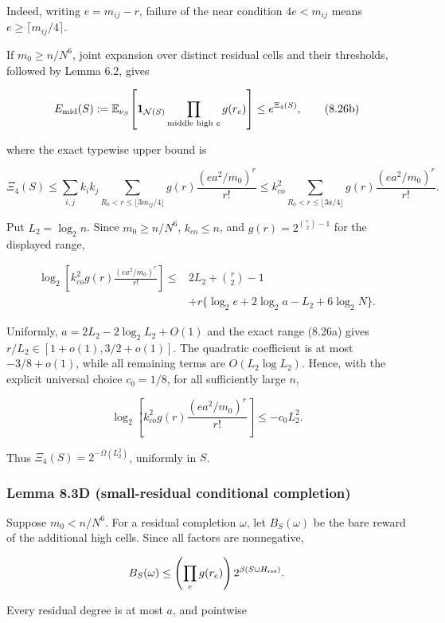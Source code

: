 \documentclass[11pt]{article}
\begin{document}
Indeed, writing \(e=m_{ij}-r\), failure of the near condition \(4e<m_{ij}\) means \(e\ge\lceil m_{ij}/4\rceil\).

If \(m_0\ge n/N^6\), joint expansion over distinct residual cells and their thresholds, followed by Lemma 6.2, gives

\[
 E_{\rm mid}(S)
 :=\mathbb E_{\nu_S}\!\left[
   \mathbf1_{\mathcal N(S)}\prod_{\text{middle high }e}g(r_e)
 \right]
 \le e^{\Xi_4(S)},
 \tag{8.26b}
\]

where the exact typewise upper bound is

\[
 \Xi_4(S)\le
 \sum_{i,j}k_i k_j
 \sum_{R_0<r\le\lfloor3m_{ij}/4\rfloor}
   g(r)\frac{(ea^2/m_0)^r}{r!}
 \le k_{co}^2
 \sum_{R_0<r\le\lfloor3a/4\rfloor}
   g(r)\frac{(ea^2/m_0)^r}{r!}.
 \tag{8.27}
\]

Put \(L_2=\log_2n\). Since \(m_0\ge n/N^6\), \(k_{co}\le n\), and \(g(r)=2^{\binom r2-1}\) for the displayed range,

\[
 \begin{split}
 \log_2\!\left[k_{co}^2g(r)\frac{(ea^2/m_0)^r}{r!}\right]
 \le{}&2L_2+\binom r2-1\\
 &+r\{\log_2e+2\log_2a-L_2+6\log_2N\}.
 \end{split}
 \tag{8.28}
\]

Uniformly, \(a=2L_2-2\log_2L_2+O(1)\) and the exact range (8.26a) gives \(r/L_2\in[1+o(1),3/2+o(1)]\). The quadratic coefficient is at most \(-3/8+o(1)\), while all remaining terms are \(O(L_2\log L_2)\). Hence, with the explicit universal choice \(c_0=1/8\), for all sufficiently large \(n\),

\[
 \log_2\!\left[k_{co}^2g(r)\frac{(ea^2/m_0)^r}{r!}\right]
 \le-c_0L_2^2.
 \tag{8.28a}
\]

Thus \(\Xi_4(S)=2^{-\Omega(L_2^2)}\), uniformly in \(S\).

\subsubsection{Lemma 8.3D (small-residual conditional completion)}\label{lemma-8.3d-small-residual-conditional-completion}

Suppose \(m_0<n/N^6\). For a residual completion \(\omega\), let \(B_S(\omega)\) be the bare reward of the additional high cells. Since all factors are nonnegative,

\[
 B_S(\omega)
 \le \left(\prod_e g(r_e)\right)2^{\beta(S\cup H_{\rm res})}.
\]

Every residual degree is at most \(a\), and pointwise
\end{document}
